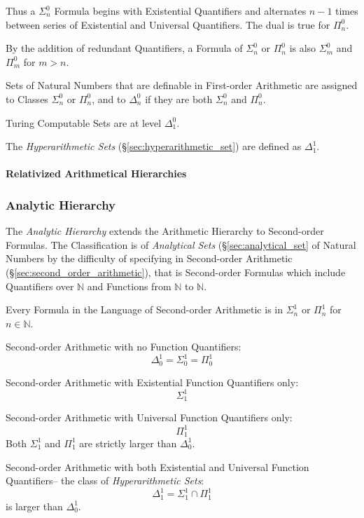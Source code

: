 Thus a $\Sigma^0_n$ Formula begins with Existential Quantifiers and
alternates $n-1$ times between series of Existential and Universal
Quantifiers. The dual is true for $\Pi^0_n$.

By the addition of redundant Quantifiers, a Formula of $\Sigma^0_n$ or
$\Pi^0_n$ is also $\Sigma^0_m$ and $\Pi^0_m$ for $m > n$.

Sets of Natural Numbers that are definable in First-order Arithmetic
are assigned to Classes $\Sigma^0_n$ or $\Pi^0_n$, and to $\Delta^0_n$
if they are both $\Sigma^0_n$ and $\Pi^0_n$.

Turing Computable Sets are at level $\Delta^0_1$.

The \emph{Hyperarithmetic Sets} (\S\ref{sec:hyperarithmetic_set})
are defined as $\Delta^1_1$.

\paragraph{Relativized Arithmetical Hierarchies}\hfill



\subsubsection{Analytic Hierarchy}\label{sec:analytic_hierarchy}

The \emph{Analytic Hierarchy} extends the Arithmetic Hierarchy to
Second-order Formulas. The Classification is of \emph{Analytical Sets}
(\S\ref{sec:analytical_set} of Natural Numbers by the difficulty of
specifying in Second-order Arithmetic
(\S\ref{sec:second_order_arithmetic}), that is Second-order Formulas which
include Quantifiers over $\mathbb{N}$ and Functions from $\mathbb{N}$
to $\mathbb{N}$.

Every Formula in the Language of Second-order Arithmetic is in
$\Sigma^1_n$ or $\Pi^1_n$ for $n \in \mathbb{N}$.

Second-order Arithmetic with no Function Quantifiers:
\[
  \Delta^1_0 = \Sigma^1_0 = \Pi^1_0
\]

Second-order Arithmetic with Existential Function Quantifiers only:
\[
  \Sigma^1_1
\]

Second-order Arithmetic with Universal Function Quantifiers only:
\[
  \Pi^1_1
\]
Both $\Sigma^1_1$ and $\Pi^1_1$ are strictly larger than $\Delta^1_0$.

Second-order Arithmetic with both Existential and Universal Function
Quantifiers-- the class of \emph{Hyperarithmetic Sets}:
\[
  \Delta^1_1 = \Sigma^1_1 \cap \Pi^1_1
\]
is larger than $\Delta^1_0$.

